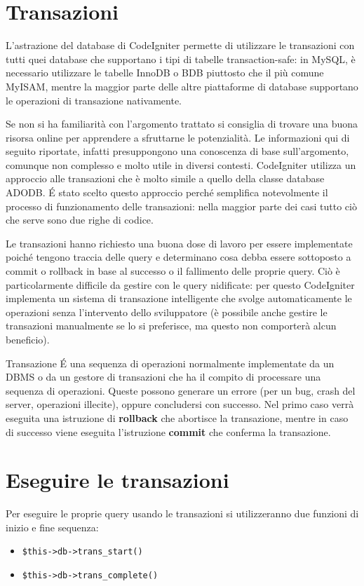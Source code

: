 \section*{Transazioni}
L'astrazione del database di CodeIgniter permette di utilizzare le transazioni con tutti quei database che supportano i tipi di tabelle transaction-safe: in MySQL, è necessario utilizzare le tabelle InnoDB o BDB piuttosto che il più comune MyISAM, mentre la maggior parte delle altre piattaforme di database supportano le operazioni di transazione nativamente.

Se non si ha familiarità con l'argomento trattato si consiglia di trovare una buona risorsa online per apprendere a sfruttarne le potenzialità. Le informazioni qui di seguito riportate, infatti presuppongono una conoscenza di base sull'argomento, comunque non complesso e molto utile in diversi contesti. CodeIgniter utilizza un approccio alle transazioni che è molto simile a quello della classe database ADODB. \'E stato scelto questo approccio perché semplifica notevolmente il processo di funzionamento delle transazioni: nella maggior parte dei casi tutto ciò che serve sono due righe di codice.

Le transazioni hanno richiesto una buona dose di lavoro per essere implementate poiché tengono traccia delle query e determinano cosa debba essere sottoposto a commit o rollback in base al successo o il fallimento delle proprie query. Ciò è particolarmente difficile da gestire con le query nidificate: per questo CodeIgniter implementa un sistema di transazione intelligente che svolge automaticamente le operazioni senza l'intervento dello sviluppatore (è possibile anche gestire le transazioni manualmente se lo si preferisce, ma questo non comporterà alcun beneficio).

\begin{deftabv}{Transazione}{
\'E una sequenza di operazioni normalmente implementate da un DBMS o da un gestore di transazioni che ha il compito di processare una sequenza di operazioni. Queste possono generare un errore (per un bug, crash del server, operazioni illecite), oppure concludersi con successo. Nel primo caso verrà eseguita una istruzione di \textbf{rollback} che abortisce la transazione, mentre in caso di successo viene eseguita l'istruzione \textbf{commit} che conferma la transazione.
}
\end{deftabv}
\normalsize

\section*{Eseguire le transazioni}
Per eseguire le proprie query usando le transazioni si utilizzeranno due funzioni di inizio e fine sequenza:
\begin{itemize}
\item  \verb|$this->db->trans_start()|
\item \verb|$this->db->trans_complete()|
\end{itemize}

